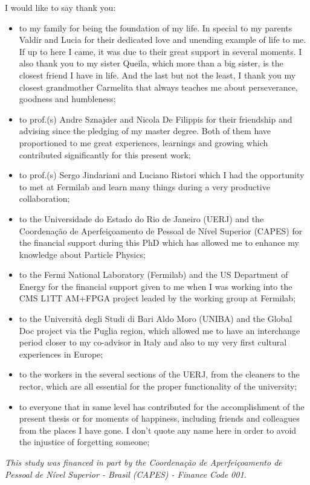 \documentclass[a4paper,12pt,oneside,onecolumn,final,fleqn]{repUERJ}
\begin{document}
\hspace{-1.2cm}I would like to say thank you: 
\begin{itemize}
\item to my family for being the foundation of my life. In special to my parents Valdir and Lucia for their dedicated love and unending example of life to me. If up to here I came, it was due to their great support in several moments. I also thank you to my sister Queila, which more than a big sister, is the closest friend I have in life. And the last but not the least, I thank you my closest grandmother Carmelita that always teaches me about perseverance, goodness and humbleness;
\item to prof.(s) Andre Sznajder and Nicola De Filippis for their friendship and advising since the pledging of my master degree. Both of them have proportioned to me great experiences, learnings and growing which contributed significantly for this present work;
\item to prof.(s) Sergo Jindariani and Luciano Ristori which I had the opportunity to met at Fermilab and learn many things during a very productive collaboration;
\item to the Universidade do Estado do Rio de Janeiro (UERJ) and the Coordenação de Aperfeiçoamento de Pessoal de Nível Superior (CAPES) for the financial support during this PhD which has allowed me to enhance my knowledge about Particle Physics;
\item to the Fermi National Laboratory (Fermilab) and the US Department of Energy for the financial support given to me when I was working into the CMS L1TT AM+FPGA project leaded by the working group at Fermilab;
\item to the Università degli Studi di Bari Aldo Moro (UNIBA) and the Global Doc project via the Puglia region, which allowed me to have an interchange period closer to my co-advisor in Italy and also to my very first cultural experiences in Europe;
\item to the workers in the several sections of the UERJ, from the cleaners to the rector, which are all essential for the proper functionality of the university;
\item to everyone that in same level has contributed for the accomplishment of the present thesis or for moments of happiness, including friends and colleagues from the places I have gone. I don't quote any name here in order to avoid the injustice of forgetting someone;
\end{itemize}
\textit{This study was financed in part by the Coordenação de Aperfeiçoamento de Pessoal de Nível Superior - Brasil (CAPES) - Finance Code 001.}
\end{document}
